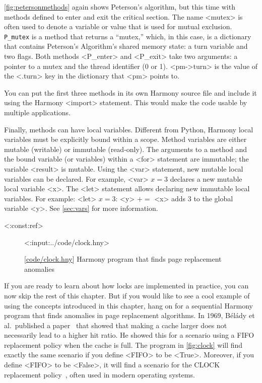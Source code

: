 \documentclass{report}
\newcommand{\harmonylink}[1]{%
[\href{https://harmony.cs.cornell.edu/#1}{\underline{#1}}]%
}
\newenvironment{code}{
\tcolorbox
}{
\endtcolorbox
}
\begin{document}
\autoref{fig:petersonmethods} again shows Peterson's algorithm,
but this time with methods defined to enter and exit the critical
section.
The name <{mutex}> is often used to denote a variable or value
that is used for mutual exclusion.
\texttt{P\_mutex} is a method that returns a ``mutex,'' which, in this
case, is a dictionary that contains Peterson's Algorithm's shared memory state:
a turn variable and two flags.
Both methods <{P_enter}> and <{P_exit}> take two arguments:
a pointer to a mutex and the thread identifier (0 or 1).
<{pm->turn}> is the value of the <{.turn}> key
in the dictionary that <{pm}> points to. 

You can put the first three methods in its own Harmony source file
and include it using the Harmony <{import}> statement.
%
%
This would make the code usable by multiple applications.

Finally, methods can have local variables.
Different from Python, Harmony local variables must be
explicitly bound within a scope.
Method variables are either mutable (writable) or immutable (read-only).
The arguments to a method and the bound variable (or
variables) within a <{for}> statement are immutable;
the variable <{result}> is mutable.
Using the <{var}> statement, new mutable local variables can be
declared.
For example, <{var}> $x = 3$ declares a new mutable local variable
<{x}>.
The <{let}> statement allows declaring new immutable local variables.
For example:
<{let}> $x = 3$: <{y}> $+$$=$ <{x}> adds 3 to the global variable
<{y}>.
See \autoref{sec:vars} for more information.

<{:const:ref}>

\begin{figure}
\begin{code}
<{:input:../code/clock.hny}>
\end{code}
\caption{\harmonylink{code/clock.hny} Harmony program that finds page replacement anomalies}
\label{fig:clock}
\end{figure}

If you are ready to learn about how locks are implemented in practice,
you can now skip the rest of this chapter.  But if you would like to
see a cool example of using the concepts introduced in this chapter,
hang on for a sequential Harmony program that finds anomalies in page
replacement algorithms.
In 1969, B\'{e}l\'{a}dy et al.~published a paper~\cite{Belady69}
that showed that making a
cache larger does not necessarily lead to a higher hit ratio.  He showed
this for a scenario using a FIFO replacement policy when the cache is full. 
The program in \autoref{fig:clock} will find exactly the same scenario
if you define <{FIFO}> to be <{True}>.  Moreover, if you define
<{FIFO}> to be <{False}>, it will find a scenario for the
CLOCK replacement policy~\cite{clock}, often used in modern operating systems.
\end{document}
